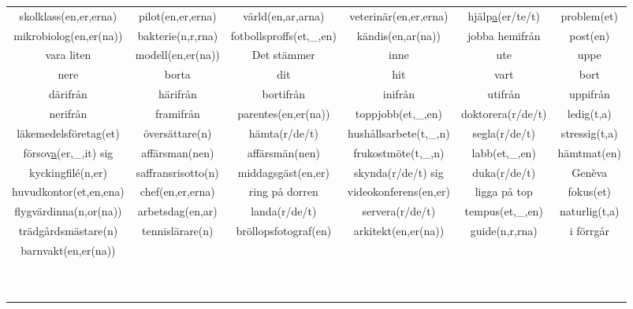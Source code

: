 
\begin{center}
    \begin{adjustwidth}{-2.7cm}{}
        \begin{tabular}{|c c c c c c|}
            \hline
            skolklass(en,er,erna) & pilot(en,er,erna) & värld(en,ar,arna) & veterinär(en,er,erna) & hjälp\underline{a}(er/te/t) & problem(et) \\
            mikrobiolog(en,er(na)) & bakterie(n,r,rna) & fotbollsproffs(et,\_,en) & kändis(en,ar(na)) & jobba hemifrån & post(en) \\
            vara liten & modell(en,er(na)) & Det stämmer & inne & ute & uppe \\
            nere & borta & dit & hit & vart & bort \\
            därifrån & härifrån & bortifrån & inifrån & utifrån & uppifrån \\
            nerifrån & framifrån & parentes(en,er(na)) & toppjobb(et,\_,en) & doktorera(r/de/t) & ledig(t,a) \\
            läkemedelsföretag(et) & översättare(n) & hämta(r/de/t) & hushållsarbete(t,\_,n) & segla(r/de/t) & stressig(t,a) \\
            försov\underline{a}(er,\_,it) sig & affärsman(nen) & affärsmän(nen) & frukostmöte(t,\_,n) & labb(et,\_,en) & hämtmat(en) \\
            kyckingfil\'e(n,er) & saffransrisotto(n) & middagsgäst(en,er) & skynda(r/de/t) sig & duka(r/de/t) & Gen\`eva \\
            huvudkontor(et,en,ena) & chef(en,er,erna) & ring på dorren & videokonferens(en,er) & ligga på top & fokus(et) \\
            flygvärdinna(n,or(na)) & arbetsdag(en,ar) & landa(r/de/t) & servera(r/de/t) & tempus(et,\_,en) & naturlig(t,a) \\
            trädgårdsmästare(n) & tennislärare(n) & bröllopsfotograf(en) & arkitekt(en,er(na)) & guide(n,r,rna) & i förrgår \\
            barnvakt(en,er(na)) &  &  &  &  &  \\
             &  &  &  &  &  \\
             &  &  &  &  &  \\
             &  &  &  &  &  \\
             &  &  &  &  &  \\
             &  &  &  &  &  \\
             &  &  &  &  &  \\
             &  &  &  &  &  \\
             &  &  &  &  &  \\
             &  &  &  &  &  \\
             &  &  &  &  &  \\
            \hline
        \end{tabular}
    \end{adjustwidth}
\end{center}

